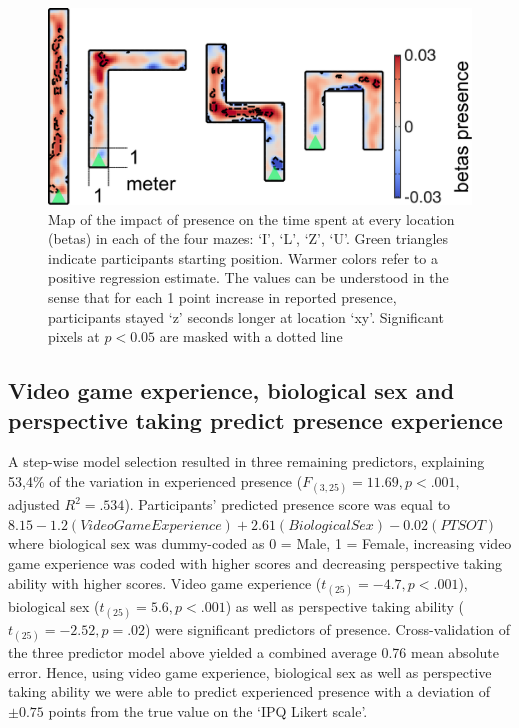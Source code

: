 \begin{figure}[!h]
\centering
\includegraphics[width=\linewidth]{figures/head_loc_reg2.pdf}
\vspace{6pt}
\caption{Map of the impact of presence on the time spent at every location (betas) in each of the four mazes: `I', `L', `Z', `U'. Green triangles indicate participants starting position. Warmer colors refer to a positive regression estimate. The values can be understood in the sense that for each 1 point increase in reported presence, participants stayed `z' seconds longer at location `xy'. Significant pixels at $p<0.05$ are masked with a dotted line}
\label{presence_head_loc}
\end{figure}

\subsection{Video game experience, biological sex and perspective taking predict presence experience} A step-wise model selection resulted in three remaining predictors, explaining 53,4\% of the variation in experienced presence ($F_{(3,25)}=11.69, p < .001,$ adjusted $R^2=.534$). Participants' predicted presence score was equal to $8.15 - 1.2 (Video Game Experience) + 2.61 (Biological Sex) - 0.02 (PTSOT)$ where biological sex was dummy-coded as 0 = Male, 1 = Female, increasing video game experience was coded with higher scores and decreasing perspective taking ability with higher scores. Video game experience ($t_{(25)}=-4.7, p<.001$), biological  sex ($t_{(25)}=5.6, p<.001$) as well as perspective taking ability ($t_{(25)}=-2.52, p=.02$) were significant predictors of presence. Cross-validation of the three predictor model above yielded a combined average 0.76 mean absolute error. Hence, using video game experience, biological sex as well as perspective taking ability we were able to predict experienced presence with a deviation of $\pm 0.75$ points from the true value on the `IPQ Likert scale'.